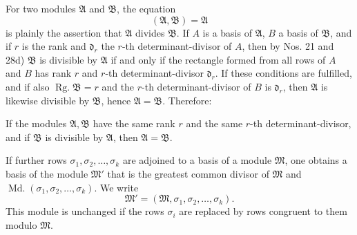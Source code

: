 \documentclass[11pt]{article}
\newcommand{\Rg}{\operatorname{Rg.}}
\newcommand{\Md}{\operatorname{Md.}}
\begin{document}
For two modules $\mathfrak A$ and $\mathfrak B$, the equation
\[
(\mathfrak A,\mathfrak B)=\mathfrak A
\]
is plainly the assertion that $\mathfrak A$ divides $\mathfrak B$. If $A$ is a basis of $\mathfrak A$, $B$ a basis of $\mathfrak B$, and if $r$ is the rank and $\mathfrak d_r$ the $r$-th determinant-divisor of $A$, then by Nos. 21 and 28d) $\mathfrak B$ is divisible by $\mathfrak A$ if and only if the rectangle formed from all rows of $A$ and $B$ has rank $r$ and $r$-th determinant-divisor $\mathfrak d_r$. If these conditions are fulfilled, and if also $\Rg\mathfrak B=r$ and the $r$-th determinant-divisor of $B$ is $\mathfrak d_r$, then $\mathfrak A$ is likewise divisible by $\mathfrak B$, hence $\mathfrak A=\mathfrak B$. Therefore:

If the modules $\mathfrak A,\mathfrak B$ have the same rank $r$ and the same $r$-th determinant-divisor, and if $\mathfrak B$ is divisible by $\mathfrak A$, then $\mathfrak A=\mathfrak B$.

If further rows $\sigma_1,
\sigma_2,
\ldots,
\sigma_k$ are adjoined to a basis of a module $\mathfrak M$, one obtains a basis of the module $\mathfrak M'$ that is the greatest common divisor of $\mathfrak M$ and $\Md(\sigma_1,
\sigma_2,
\ldots,
\sigma_k)$. We write
\[
\mathfrak M'=(\mathfrak M,\sigma_1,\sigma_2,\ldots,\sigma_k).
\]
This module is unchanged if the rows $\sigma_i$ are replaced by rows congruent to them modulo $\mathfrak M$.
\end{document}
